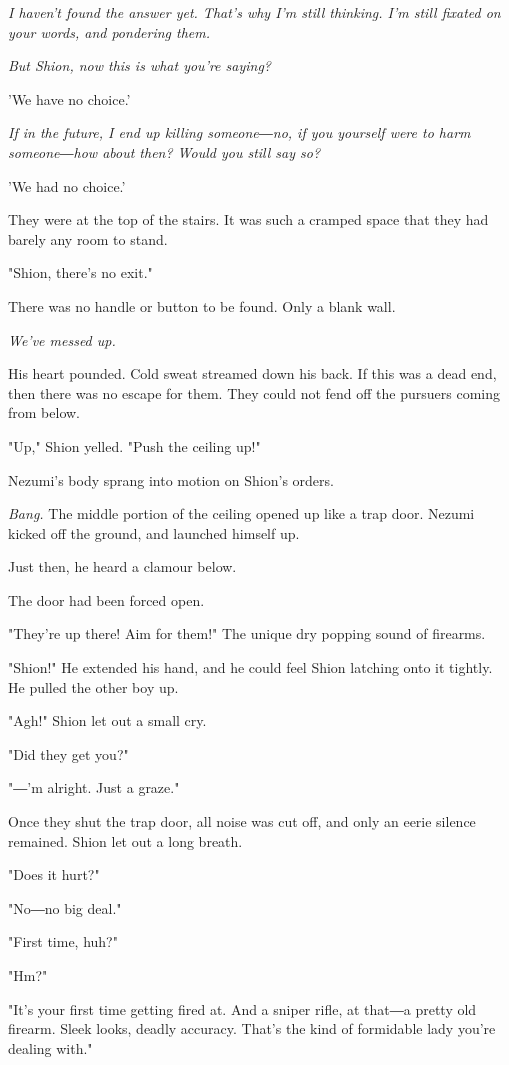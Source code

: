 \emph{I haven't found the answer yet. That's why I'm still thinking. I'm still
	fixated on your words, and pondering them.}

\emph{But Shion, now this is what you're saying?}

'We have no choice.'

\emph{If in the future, I end up killing someone―no, if you yourself were to
	harm someone―how about then? Would you still say so?}

'We had no choice.'

\mybreak

They were at the top of the stairs. It was such a cramped space that
they had barely any room to stand.

"Shion, there's no exit."

There was no handle or button to be found. Only a blank wall.

\emph{We've messed up.}

His heart pounded. Cold sweat streamed down his back. If this was a dead
end, then there was no escape for them. They could not fend off the
pursuers coming from below.

"Up," Shion yelled. "Push the ceiling up!"~

Nezumi's body sprang into motion on Shion's orders.

\emph{Bang.} The middle portion of the ceiling opened up like a trap door.
Nezumi kicked off the ground, and launched himself up.~

Just then, he heard a clamour below.

The door had been forced open.

"They're up there! Aim for them!" The unique dry popping sound of
firearms.

"Shion!" He extended his hand, and he could feel Shion latching onto it
tightly. He pulled the other boy up.

"Agh!" Shion let out a small cry.

"Did they get you?"

"―'m alright. Just a graze."

Once they shut the trap door, all noise was cut off, and only an eerie
silence remained. Shion let out a long breath.

"Does it hurt?"

"No―no big deal."

"First time, huh?"

"Hm?"

"It's your first time getting fired at. And a sniper rifle, at that―a
pretty old firearm. Sleek looks, deadly accuracy. That's the kind of
formidable lady you're dealing with."

